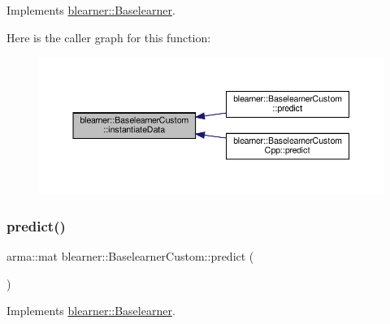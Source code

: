 Implements \hyperlink{classblearner_1_1_baselearner_af01f1b8c4540927705ff79c3649489f7}{blearner\+::\+Baselearner}.

Here is the caller graph for this function\+:
\nopagebreak
\begin{figure}[H]
\begin{center}
\leavevmode
\includegraphics[width=350pt]{classblearner_1_1_baselearner_custom_a83c25e681bb606ae4a36c249a36229b9_icgraph}
\end{center}
\end{figure}
\mbox{\label{classblearner_1_1_baselearner_custom_a7d9640dbb9a118b77735cf79a5850652}} 
\subsubsection{\texorpdfstring{predict()}{predict()}\hspace{0.1cm}{\footnotesize\ttfamily [1/2]}}
{\footnotesize\ttfamily arma\+::mat blearner\+::\+Baselearner\+Custom\+::predict (\begin{DoxyParamCaption}{ }\end{DoxyParamCaption})\hspace{0.3cm}{\ttfamily [virtual]}}



Implements \hyperlink{classblearner_1_1_baselearner_ab37986047db43c84420fef2cef7fc20d}{blearner\+::\+Baselearner}.

